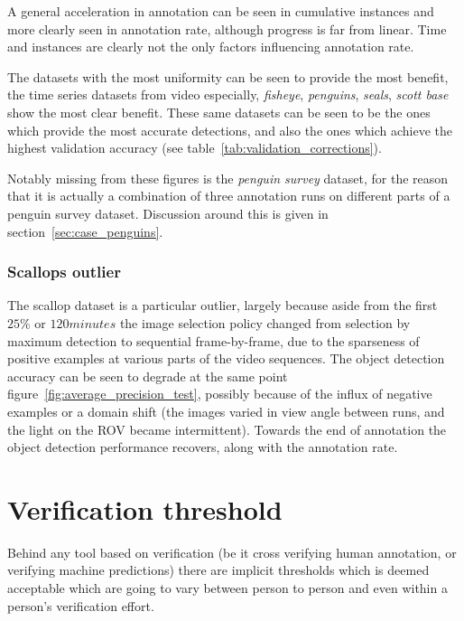 A general acceleration in annotation can be seen in cumulative instances and more clearly seen in annotation rate, although progress is far from linear. Time and instances are clearly not the only factors influencing annotation rate. 

The datasets with the most uniformity can be seen to provide the most benefit, the time series datasets from video especially, \emph{fisheye}, \emph{penguins}, \emph{seals}, \emph{scott base} show the most clear benefit. These same datasets can be seen to be the ones which provide the most accurate detections, and also the ones which achieve the highest validation accuracy (see table~\ref{tab:validation_corrections}).

Notably missing from these figures is the \emph{penguin survey} dataset, for the reason that it is actually a combination of three annotation runs on different parts of a penguin survey dataset. Discussion around this is given in section~\ref{sec:case_penguins}.


\subsubsection{Scallops outlier}
\label{sec:scallop_outlier}

The scallop dataset is a particular outlier, largely because aside from the first $25\%$ or $120 minutes$ the image selection policy changed from selection by maximum detection to sequential frame-by-frame, due to the sparseness of positive examples at various parts of the video sequences. The object detection accuracy can be seen to degrade at the same point figure~\ref{fig:average_precision_test}, possibly because of the influx of negative examples or a domain shift (the images varied in view angle between runs, and the light on the \gls{ROV} became intermittent). Towards the end of annotation the object detection performance recovers, along with the annotation rate. 



\section{Verification threshold}
\label{sec:verification_threshold}

Behind any tool based on verification (be it cross verifying human annotation, or verifying machine predictions) there are implicit thresholds which is deemed acceptable which are going to vary between person to person and even within a person's verification effort. 

